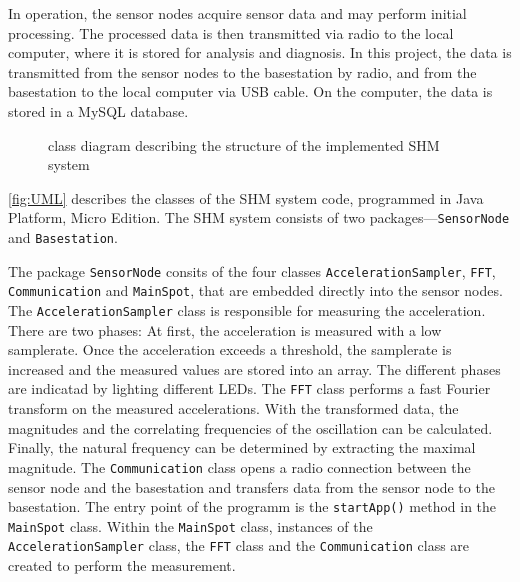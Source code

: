 \documentclass[12pt,a4paper]{scrartcl}
\begin{document}
	In operation, the sensor nodes acquire sensor data and may perform initial processing.
	The processed data is then transmitted via radio to the local computer, where it is stored for analysis and diagnosis.
	In this project, the data is transmitted from the sensor nodes to the basestation by radio, and from the basestation to the local computer via USB cable.
	On the computer, the data is stored in a MySQL database.
	
	\begin{figure}[ht]
		\centering
		\caption{class diagram describing the structure of the implemented SHM system}
		\label{fig:UML}
	\end{figure}
	
	\autoref{fig:UML} describes the classes of the SHM system code, programmed in Java Platform, Micro Edition. 
	The SHM system consists of two packages---\texttt{SensorNode} and \texttt{Basestation}.
	
	The package \texttt{SensorNode} consits of the four classes \texttt{Acceleration\-Sampler}, \texttt{FFT}, \texttt{Communication} and \texttt{MainSpot}, that are embedded directly into the sensor nodes.
	The \texttt{AccelerationSampler} class is responsible for measuring the acceleration.
	There are two phases: At first, the acceleration is measured with a low samplerate.
	Once the acceleration exceeds a threshold, the samplerate is increased and the measured values are stored into an array.
	The different phases are indicatad by lighting different LEDs.
	The \texttt{FFT} class performs a fast Fourier transform on the measured accelerations. 
	With the transformed data, the magnitudes and the correlating frequencies of the oscillation can be calculated.
	Finally, the natural frequency can be determined by extracting the maximal magnitude.
	The \texttt{Communication} class opens a radio connection between the sensor node and the basestation and transfers data from the sensor node to the basestation.
	The entry point of the programm is the \texttt{startApp()} method in the \texttt{MainSpot} class. 
	Within the \texttt{MainSpot} class, instances of the \texttt{Acceleration\-Sampler} class, the \texttt{FFT} class and the \texttt{Communication} class are created to perform the measurement.
	
\end{document}
